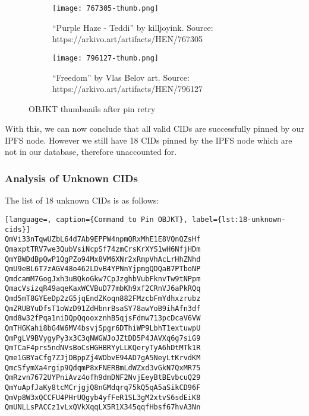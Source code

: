 \begin{figure}[H]
  \centering
  \begin{subfigure}[b]{0.45\textwidth}
    \centering
    \texttt{[image: 767305-thumb.png]}
    \caption{``Purple Haze - Teddi'' by killjoyink. Source: \\https://arkivo.art/artifacts/HEN/767305}
    \label{fig:purple-haze}
  \end{subfigure}
  \hfill
  \begin{subfigure}[b]{0.45\textwidth}
    \centering
    \texttt{[image: 796127-thumb.png]}
    \caption{``Freedom'' by Vlas Belov art. Source: \\https://arkivo.art/artifacts/HEN/796127}
    \label{fig:freedom}
  \end{subfigure}
  \caption{OBJKT thumbnails after pin retry}
  \label{fig:2-repinned-cids}
\end{figure}

With this, we can now conclude that all valid CIDs are successfully pinned by our IPFS node. However we still have 18 CIDs pinned by the IPFS node which are not in our database, therefore unaccounted for.


\subsubsection{Analysis of Unknown CIDs}

The list of 18 unknown CIDs is as follows:

\begin{lstlisting}[language=, caption={Command to Pin OBJKT}, label={lst:18-unknown-cids}] 
QmVi33nTqwUZbL64d7Ab9EPPW4npmQRxMhE1E8VQnQZsHf
QmaxptTRV7we3QubVsiNcpSf74zmCrsKrXYS1wH6NfjHDm
QmYBWDdBpQwP1QgPZo94Mx8VM6XNr2xRmpVhAcLrHhZNhd
QmU9eBL6T7zAGV48o462LDvB4YPNnYjpmgQDQaB7PTboNP
QmdcamM7GogJxh3uBQkoGkw7CpJzghbVubFknvTw9tNPpm
QmacVsizqR49aqeKaxWCVBuD77mbKh9xf2CRnVJ6aPkRQq
Qmd5mT8GYEeDp2zG5jqEndZKoqn882FMzcbFmYdhxzrubz
QmZRUBYuDfsT1oWzD91ZdHbnrBsaSY78awYoB9ihAfn3df
Qmd8w32fPqa1niDQpQqooxznhB5qjsFdmw713pcDcaV6VW
QmTHGKahi8bG4W6MV4bsvjSpgr6DThiWP9LbhT1extuwpU
QmPgLV9BVygyPy3x3C3qNWGWJoJZtDD5P4JAVXq6g7siG9
QmTCaF4prs5ndNVsBoCsHGHBRYyLLKQeryTyA6hDtMTk1R
Qme1GBYaCfg7ZJjDBppZj4WDbvE94AD7gA5NeyLtKrvdKM
QmcSfymXa4rgip9QdqmP8xFNERBmLdWZxd3vGkN7QxMR75
QmRzvn7672UYPniAvz4ofh9dmDNF2NvjEeyBtBEvbcuQ29
QmYuApfJaKy8tcMCrjgjQ8nGMdqrq75kQ5qA5aSikCD96F
QmVp8W3xQCCFU4PHrUQgyb4yfFeR1SL3gM2xtvS6sdEiK8
QmUNLLsPACCz1vLxQVkXqqLX5R1X345qqfHbsf67hvA3Nn
\end{lstlisting}


